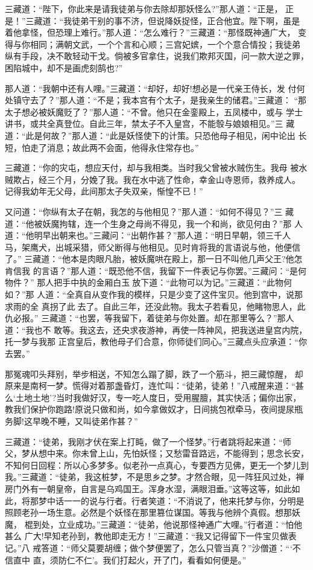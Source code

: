 三藏道：“陛下，你此来是请我徒弟与你去除却那妖怪么?”那人道：“正是，
正是！”三藏道：“我徒弟干别的事不济，但说降妖捉怪，正合他宜。陛下啊，虽是
着他拿怪，但恐理上难行。”那人道：“怎么难行？”三藏道：“那怪既神通广大，
变得与你相同；满朝文武，一个个言和心顺；三宫妃嫔，一个个意合情投；我徒弟
纵有手段，决不敢轻动干戈。倘被多官拿住，说我们欺邦灭国，问一款大逆之罪，
困陷城中，却不是画虎刻鹄也?”

那人道：“我朝中还有人哩。”三藏道：“却好，却好!想必是一代亲王侍长，发
付何处镇守去了？”那人道：“不是；我本宫有个太子，是我亲生的储君。”三藏道：
“那太子想必被妖魔贬了？”那人道：“不曾。他只在金銮殿上，五凤楼中，或与
学士讲书，或共全真登位。自此三年，禁太子不入皇宫，不能彀与娘娘相见。”三
藏道：“此是何故？”那人道：“此是妖怪使下的计策。只恐他母子相见，闲中论出
长短，怕走了消息；故此两不会面，他得永住常存也。”

三藏道：“你的灾屯，想应天付，却与我相类。当时我父曾被水贼伤生。我母
被水贼欺占，经三个月，分娩了我。我在水中逃了性命，幸金山寺恩师，救养成人。
记得我幼年无父母，此间那太子失双亲，惭惶不已！”

又问道：“你纵有太子在朝，我怎的与他相见？”那人道：“如何不得见？”三
藏道：“他被妖魔拘辖，连一个生身之母尚不得见，我一个和尚，欲见何由？”那
人道：“他明早出朝来也。”三藏问：“出朝作甚？”那人道：“明日早朝，领三千人
马，架鹰犬，出城采猎，师父断得与他相见。见时肯将我的言语说与他，他便信了。”
三藏道：“他本是肉眼凡胎，被妖魔哄在殿上，那一日不叫他几声父王?他怎肯信我
的言语？”那人道：“既恐他不信，我留下一件表记与你罢。”三藏问：“是何物件？”
那人把手中执的金厢白玉放下道：“此物可以为记。”三藏道：“此物何如？”那
人道：“全真自从变作我的模样，只是少变了这件宝贝。他到宫中，说那求雨的全
真拐了此去了。自此三年，还没此物。我太子若看见，他睹物思人，此仇必报。”
三藏道：“也罢，等我留下，着徒弟与你处置。却在那里等么？”那人道：“我也不
敢等。我这去，还央求夜游神，再使一阵神风，把我送进皇宫内院，托一梦与我那
正宫皇后，教他母子们合意，你师徒们同心。”三藏点头应承道：“你去罢。”

那冤魂叩头拜别，举步相送，不知怎么蹋了脚，跌了一个筋斗，把三藏惊醒，
却原来是南柯一梦。慌得对着那盏昏灯，连忙叫：“徒弟，徒弟！”八戒醒来道：“甚
么‘土地土地’?当时我做好汉，专一吃人度日，受用腥膻，其实快活；偏你出家，
教我们保护你跑路!原说只做和尚，如今拿做奴才，日间挑包袱牵马，夜间提尿瓶
务脚!这早晚不睡，又叫徒弟作甚？”

三藏道：“徒弟，我刚才伏在案上打盹，做了一个怪梦。”行者跳将起来道：“师
父，梦从想中来。你未曾上山，先怕妖怪；又愁雷音路远，不能得到；思念长安，
不知何日回程：所以心多梦多。似老孙一点真心，专要西方见佛，更无一个梦儿到
我。”三藏道：“徒弟，我这桩梦，不是思乡之梦。才然合眼，见一阵狂风过处，禅
房门外有一朝皇帝，自言是乌鸡国王。浑身水湿，满眼泪垂。”这等这等，如此如
此，将那梦中话一一的说与行者。行者笑道：“不消说了，他来托梦与你，分明是
照顾老孙一场生意。必然是个妖怪在那里篡位谋国。等我与他辨个真假。想那妖魔，
棍到处，立业成功。”三藏道：“徒弟，他说那怪神通广大哩。”行者道：“怕他甚么
广大!早知老孙到，教他即走无方！”三藏道：“我又记得留下一件宝贝做表记。”八
戒答道：“师父莫要胡缠；做个梦便罢了，怎么只管当真？”沙僧道：“‘不信直中
直，须防仁不仁’。我们打起火，开了门，看看如何便是。”

